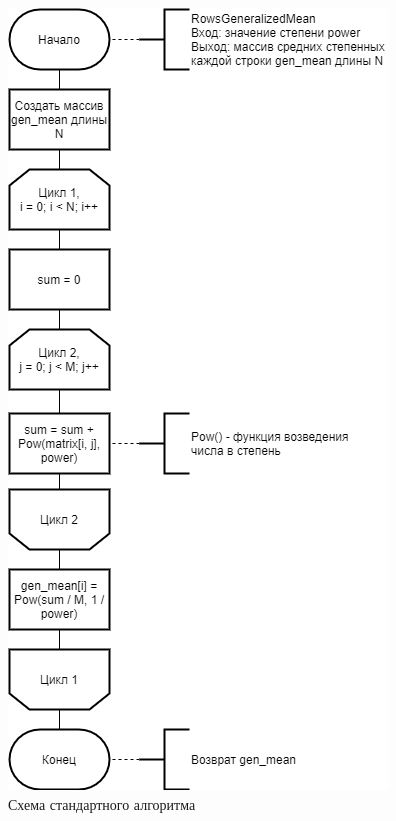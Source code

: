 \documentclass[12pt]{report}
\begin{document}
\begin{figure}[H]
	\centering
	\includegraphics[scale = 0.5]{standart_scheme.png}
	\caption{Схема стандартного алгоритма}
	\label{std}
\end{figure}
\end{document}
